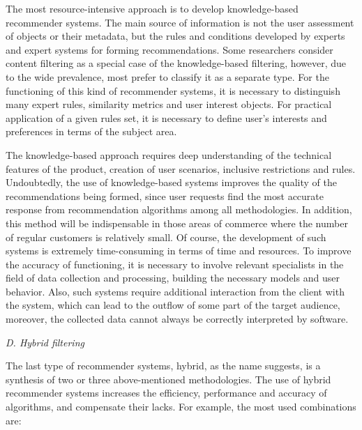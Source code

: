 \documentclass[10pt, a4paper]{article}
\begin{document}
\begin{multicols}{2}
\hspace{-0.8em}
The most resource-intensive approach is to develop
knowledge-based recommender systems. The main source
of information is not the user assessment of objects or
their metadata, but the rules and conditions developed by
experts and expert systems for forming recommendations.
Some researchers consider content filtering as a special
case of the knowledge-based filtering, however, due to the
wide prevalence, most prefer to classify it as a separate
type. For the functioning of this kind of recommender
systems, it is necessary to distinguish many expert rules,
similarity metrics and user interest objects. For practical
application of a given rules set, it is necessary to define
user’s interests and preferences in terms of the subject area.\par
The knowledge-based approach requires deep
understanding of the technical features of the product,
creation of user scenarios, inclusive restrictions and
rules. Undoubtedly, the use of knowledge-based systems
improves the quality of the recommendations being
formed, since user requests find the most accurate
response from recommendation algorithms among
all methodologies. In addition, this method will be
indispensable in those areas of commerce where the
number of regular customers is relatively small. Of
course, the development of such systems is extremely
time-consuming in terms of time and resources. To
improve the accuracy of functioning, it is necessary to
involve relevant specialists in the field of data collection
and processing, building the necessary models and user
behavior. Also, such systems require additional interaction
from the client with the system, which can lead to the
outflow of some part of the target audience, moreover, the
collected data cannot always be correctly interpreted by
software.

\vspace{-0.5em}
\begin{flushleft}
\textit{D. Hybrid filtering}
\end{flushleft}
\vspace{-0.9em}

\hspace{-1.3em}
The last type of recommender systems, hybrid,
as the name suggests, is a synthesis of two or
three above-mentioned methodologies. The use of
hybrid recommender systems increases the efficiency,
performance and accuracy of algorithms, and compensate
their lacks. For example, the most used combinations are:


\end{multicols}
\end{document}
